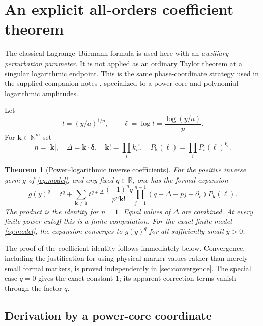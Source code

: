 \documentclass[11pt,a4paper]{article}
\numberwithin{equation}{section}
\newtheorem{theorem}{Theorem}[section]
\theoremstyle{definition}\newtheorem{definition}[theorem]{Definition}
\theoremstyle{remark}\newtheorem{remark}[theorem]{Remark}
\newcommand{\R}{\mathbb R}\newcommand{\C}{\mathbb C}\newcommand{\N}{\mathbb N}
\newcommand{\D}{\partial_\ell}
\begin{document}
\section{An explicit all-orders coefficient theorem}
\label{sec:main}

The classical Lagrange--B\"urmann formula \cite{dlmf} is used here with an
\emph{auxiliary perturbation parameter}. It is not applied as an ordinary
Taylor theorem at a singular logarithmic endpoint. This is the same
phase-coordinate strategy used in the supplied companion notes
\cite{companion}, specialized to a power core and polynomial logarithmic
amplitudes.

Let
\begin{equation}
 t=(y/a)^{1/p},\qquad \ell=\log t=\frac{\log(y/a)}p.
 \label{eq:normalization}
\end{equation}
For $\bm k\in\N^m$ set
\begin{equation}
 n=|\bm k|,\quad \Delta=\bm k\cdot\bm\delta,
 \quad \bm k!=\prod_i k_i!,\quad
 P_{\bm k}(\ell)=\prod_iP_i(\ell)^{k_i}.
 \label{eq:multi-notation}
\end{equation}

\begin{theorem}[Power--logarithmic inverse coefficients]
\label{thm:coefficients}
For the positive inverse germ $g$ of \cref{eq:model}, and any fixed
$q\in\R$, one has the formal expansion
\begin{equation}
 \boxed{\displaystyle
 g(y)^q=t^q+
 \sum_{\bm k\ne\bm0}t^{q+\Delta}
 \frac{(-1)^n q}{p^n\bm k!}
 \prod_{j=1}^{n-1}(q+\Delta+pj+\D)P_{\bm k}(\ell).}
 \label{eq:master}
\end{equation}
The product is the identity for $n=1$. Equal values of $\Delta$ are
combined. At every finite power cutoff this is a finite computation.
For the exact finite model \cref{eq:model}, the expansion converges to
$g(y)^q$ for all sufficiently small $y>0$.
\end{theorem}

The proof of the coefficient identity follows immediately below.
Convergence, including the justification for using physical marker
values rather than merely small formal markers, is proved independently
in \cref{sec:convergence}. The special case $q=0$ gives the exact constant
$1$; its apparent correction terms vanish through the factor $q$.

\subsection{Derivation by a power-core coordinate}
\end{document}
